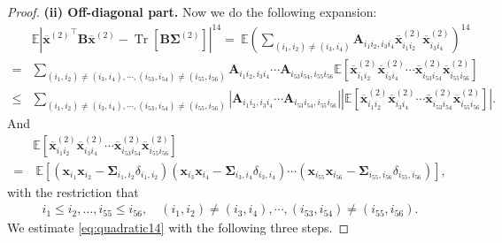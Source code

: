 \documentclass[twoside,11pt]{article}
\newcommand{\E}{\mathbb{E}}
\def\bA{{\boldsymbol A}}
\def\bB{{\boldsymbol B}}
\def\bx{{\boldsymbol x}}
\def\bSigma{{\boldsymbol \Sigma}}
\newcommand{\Tr}{\operatorname{Tr}}
\newcommand{\1}{\mathbf{1}}
\begin{document}
\begin{proof}
    \textbf{ (ii) Off-diagonal part.} 
Now we do the following expansion:
    \begin{align}\label{eq:quadratic14}
      & \E\left| {\overline\bx^{(2)}}^\top \bB\overline\bx^{(2)}-\Tr[\bB\bSigma^{(2)}]\right|^{14} 
    =~\E \left( \sum_{(i_1,i_2)\not= (i_3,i_4)}\bA_{i_1i_2,i_3i_4} \overline\bx^{(2)}_{i_1i_2}\overline\bx^{(2)}_{i_3i_4}\right)^{14}\\
    =& \sum_{(i_1,i_2)\not=(i_3,i_4),\cdots, (i_{53},i_{54})\not= (i_{55},i_{56})}\bA_{i_1i_2,i_3i_4}\cdots \bA_{i_{53}i_{54},i_{55}i_{56}} \E\left[ \overline\bx^{(2)}_{i_1i_2}\overline\bx^{(2)}_{i_3i_4}\cdots \overline\bx^{(2)}_{i_{53}i_{54}}\overline\bx^{(2)}_{i_{55}i_{56}} \right]\\
    \leq &\sum_{(i_1,i_2)\not=(i_3,i_4),\cdots, (i_{53},i_{54})\not= (i_{55},i_{56})} |\bA_{i_1i_2,i_3i_4}\cdots \bA_{i_{53}i_{54},i_{55}i_{56}}| \left| \E\left[ \overline\bx^{(2)}_{i_1i_2}\overline\bx^{(2)}_{i_3i_4}\cdots \overline\bx^{(2)}_{i_{53}i_{54}}\overline\bx^{(2)}_{i_{55}i_{56}} \right]\right| . 
    \end{align}
    And 
    \begin{align}\label{eq:product24}
 & \E\left[ \overline\bx^{(2)}_{i_1i_2}\overline\bx^{(2)}_{i_3i_4}\cdots \overline\bx^{(2)}_{i_{53}i_{54}}\overline\bx^{(2)}_{i_{55}i_{56}} \right]\\
  =&~\E\left[(\bx_{i_1}\bx_{i_2}-\bSigma_{i_1,i_2}\delta_{i_1,i_2})(\bx_{i_3}\bx_{i_4}-\bSigma_{i_3,i_4}\delta_{i_3,i_4})\cdots  (\bx_{i_{55}}\bx_{i_{56}}-\bSigma_{i_{55},i_{56}}\delta_{i_{55},i_{56}})\right], 
    \end{align}
    with the restriction that  
    \begin{align}\label{eq:restriction}
    i_1\leq i_2,\dots, i_{55}\leq i_{56}, \quad (i_1,i_2)\not=(i_3,i_4),\cdots, (i_{53},i_{54})\not= (i_{55},i_{56}).
\end{align}    
We estimate \eqref{eq:quadratic14} with the following three steps.


\end{proof}
\end{document}
